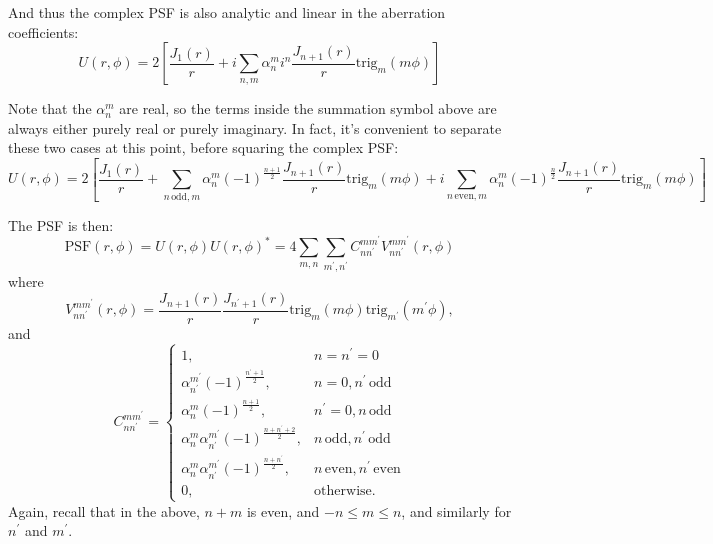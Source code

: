 \documentclass{article}
\newcommand{\trig}{\mathrm{trig}}
\begin{document}
And thus the complex PSF is also analytic and linear in the aberration coefficients:
\begin{equation}
  U(r, \phi) = 2\left[\frac{J_1(r)}{r} + i \sum_{n,m} \alpha_n^m i^n \frac{J_{n+1}(r)}{r}\trig_m(m \phi)\right]
\end{equation}

Note that the $\alpha_n^m$ are real, so the terms inside the summation symbol above are always either purely real or purely imaginary.  In fact, it's convenient to separate these two cases at this point, before squaring the complex PSF:
\begin{equation}
  U(r, \phi) = 2\left[\frac{J_1(r)}{r} + \sum_{n\,\mathrm{odd}, m}\alpha_n^m(-1)^{\frac{n+1}{2}}\frac{J_{n+1}(r)}{r}\trig_m(m \phi) + i\sum_{n\,\mathrm{even}, m}\alpha_n^m(-1)^\frac{n}{2}\frac{J_{n+1}(r)}{r}\trig_m(m \phi)\right]
\end{equation}

The PSF is then:
\begin{equation}
  \label{eqn:PSF_expand}
  \mathrm{PSF}(r, \phi) = U(r, \phi) U(r, \phi)^* = 4 \sum_{m,n}\sum_{m^\prime, n^\prime} C_{n n^\prime}^{m m^\prime}
  V_{n n^\prime}^{m m^\prime}(r, \phi)
\end{equation}
where
\begin{equation}
  V_{n n^\prime}^{m m^\prime}(r, \phi) = \frac{J_{n+1}(r)}{r}\frac{J_{n^\prime+1}(r)}{r} \trig_m(m \phi) \trig_{m^\prime}(m^\prime \phi),
\end{equation}
and
\begin{equation}
  C_{n n^\prime}^{m m^\prime} =
  \begin{cases}
    1, & n=n^\prime=0 \\
    \alpha^{m^\prime}_{n^\prime} (-1)^{\frac{n^\prime+1}{2}}, & n=0, n^\prime \, \mathrm{odd} \\
    \alpha^m_n (-1)^{\frac{n+1}{2}}, & n^\prime=0, n \, \mathrm{odd} \\
    \alpha^m_n \alpha^{m^\prime}_{n^\prime} (-1)^{\frac{n+n^\prime+2}{2}}, & n \, \mathrm{odd}, n^\prime \, \mathrm{odd} \\
    \alpha^m_n \alpha^{m^\prime}_{n^\prime} (-1)^{\frac{n+n^\prime}{2}}, & n \, \mathrm{even}, n^\prime \, \mathrm{even} \\
    0, & \mathrm{otherwise}.
  \end{cases}
\end{equation}
Again, recall that in the above, $n+m$ is even, and $-n \le m \le n$, and similarly for $n^\prime$ and $m^\prime$.
\end{document}
